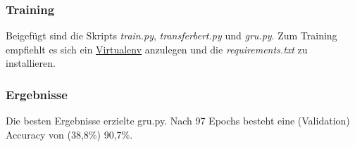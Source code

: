 \documentclass[10pt,a4paper]{article}
\begin{document}
\subsubsection{Training}
\begin{flushleft}
Beigefügt sind die Skripts \emph{train.py}, \emph{transferbert.py} und \emph{gru.py}. Zum Training empfiehlt es sich ein \href{https://docs.python.org/3/tutorial/venv.html}{Virtualenv} anzulegen und die \emph{requirements.txt} zu installieren.
\end{flushleft}

\subsubsection{Ergebnisse}
\begin{flushleft}
Die besten Ergebnisse erzielte gru.py. \newline
Nach 97 Epochs besteht eine (Validation) Accuracy von (38,8\%) 90,7\%.
\end{flushleft}
\newpage

\begingroup
\raggedright
\sloppy
\printbibliography
\endgroup
\end{document}
